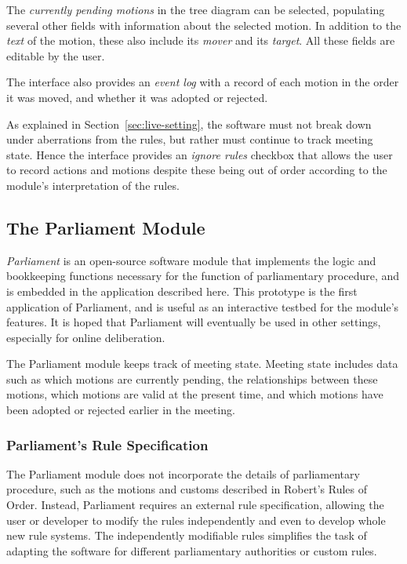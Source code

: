 \documentclass{acm_proc_article-sp}
\begin{document}
The \emph{currently pending motions} in the tree diagram can be selected, populating several other fields with information about the selected motion. In addition to the \emph{text} of the motion, these also include its \emph{mover} and its \emph{target}. All these fields are editable by the user.

The interface also provides an \emph{event log} with a record of each motion in the order it was moved, and whether it was adopted or rejected.

As explained in Section~\ref{sec:live-setting}, the software must not break down under aberrations from the rules, but rather must continue to track meeting state. Hence the interface provides an \emph{ignore rules} checkbox that allows the user to record actions and motions despite these being out of order according to the module's interpretation of the rules.

\subsection{The Parliament Module}
 
\emph{Parliament} \cite{shanks:parliament} is an open-source software module that implements the logic and bookkeeping functions necessary for the function of parliamentary procedure, and is embedded in the application described here. This prototype is the first application of Parliament, and is useful as an interactive testbed for the module's features. It is hoped that Parliament will eventually be used in other settings, especially for online deliberation.
 
The Parliament module keeps track of meeting state. Meeting state includes data such as which motions are currently pending, the relationships between these motions, which motions are valid at the present time, and which motions have been adopted or rejected earlier in the meeting.

\subsubsection*{Parliament's Rule Specification}

The Parliament module does not incorporate the details of parliamentary procedure, such as the motions and customs described in Robert's Rules of Order. Instead, Parliament requires an external rule specification, allowing the user or developer to modify the rules independently and even to develop whole new rule systems. The independently modifiable rules simplifies the task of adapting the software for different parliamentary authorities or custom rules.
\end{document}
